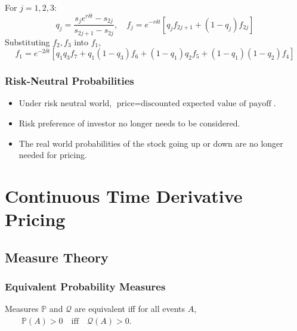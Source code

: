 \documentclass[11pt]{article}
\newcommand{\PR}{\mathbb{P}}
\newcommand{\Q}{\mathcal{Q}}
\begin{document}
\begin{center}
{
		}
		\end{center}
	For \( j = 1,2,3 \):
	\[	q_j = \frac{s_{j}e^{r\delta t} - s_{2j}}{s_{2j+1} - s_{2j}}, \quad
		f_{j} = e^{-r\delta t}\left[q_{j} f_{2j+1} + (1-q_{j})f_{2j}\right]
			\]
	Substituting \( f_2, f_3 \) into \( f_1 \),
	\[	f_1 = e^{-2\delta t}\left[q_1q_3 f_7 + q_1 (1- q_3) f_6 + 
								  (1-q_1) q_2 f_5 + (1 - q_1)(1-q_2) f_4\right]
		\]
	\subsubsection{Risk-Neutral Probabilities}
	\begin{itemize}
		\item Under risk neutral world, \( \text{price} = \text{discounted expected value of payoff} \).
		\item Risk preference of investor no longer needs to be considered.
		\item The real world probabilities of the stock going up or down are no longer needed for pricing.
		\end{itemize}
	\newpage
	\section{Continuous Time Derivative Pricing}
	\subsection{Measure Theory}
	\subsubsection{Equivalent Probability Measures}
	Measures \( \PR \) and \( \Q \) are equivalent iff for all events \( A \), \(\qquad \PR(A)>0\quad\text{iff}\quad\Q(A)>0 \).
\end{document}
